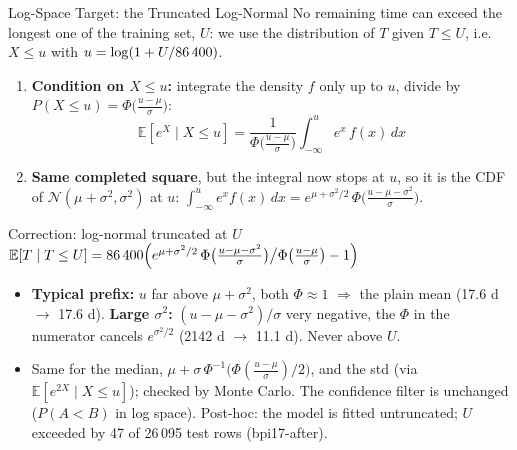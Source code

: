 \documentclass[aspectratio=169]{beamer} %
\begin{document}
\begin{frame}{Log-Space Target: the Truncated Log-Normal}
  \scriptsize\setlength{\abovedisplayskip}{2pt}\setlength{\belowdisplayskip}{2pt}
  No remaining time can exceed the longest one of the training set, $U$: we use the distribution of $T$
  \alert{given $T \le U$}, i.e.\ $X \le u$ with $u = \log(1 + U/\text{86\,400})$.
  \begin{enumerate}
    \item \textbf{Condition on $X \le u$:} integrate the density $f$ only up to $u$, divide by
      $P(X \le u) = \Phi\bigl(\frac{u-\mu}{\sigma}\bigr)$:
      \[
        \mathbb{E}[e^X \mid X \le u] = \frac{1}{\Phi\bigl(\frac{u-\mu}{\sigma}\bigr)}\int_{-\infty}^{u} e^{x}\, f(x)\,dx
      \]
    \item \textbf{Same completed square}, but the integral now stops at $u$, so it is the CDF of
      $\mathcal{N}(\mu+\sigma^2,\sigma^2)$ at $u$:\;
      $\int_{-\infty}^{u} e^{x} f(x)\,dx = e^{\mu + \sigma^2/2}\,\Phi\bigl(\frac{u - \mu - \sigma^2}{\sigma}\bigr)$.
  \end{enumerate}
  \begin{block}{Correction: log-normal truncated at $U$}
    \centering
    $\mathbb{E}[T \mid T \le U] = \text{86\,400}\Bigl(e^{\mu + \sigma^2/2}\,
      \Phi\bigl(\tfrac{u - \mu - \sigma^2}{\sigma}\bigr) \big/ \Phi\bigl(\tfrac{u - \mu}{\sigma}\bigr) - 1\Bigr)$
  \end{block}
  \begin{itemize}
    \item \textbf{Typical prefix:} $u$ far above $\mu + \sigma^2$, both $\Phi \approx 1$ $\Rightarrow$ the plain mean
      (17.6 d $\rightarrow$ 17.6 d). \textbf{Large $\sigma^2$:} $(u-\mu-\sigma^2)/\sigma$ very negative, the
      $\Phi$ in the numerator cancels $e^{\sigma^2/2}$ (2142 d $\rightarrow$ \alert{11.1 d}). Never above $U$.
    \item Same for the median, $\mu + \sigma\,\Phi^{-1}\bigl(\Phi(\frac{u-\mu}{\sigma})/2\bigr)$, and the std
      (via $\mathbb{E}[e^{2X} \mid X \le u]$); checked by Monte Carlo. The confidence filter is unchanged
      ($P(A<B)$ in log space). Post-hoc: the model is fitted untruncated; $U$ exceeded by 47 of 26\,095 test
      rows (bpi17-after).
  \end{itemize}
\end{frame}
\end{document}
